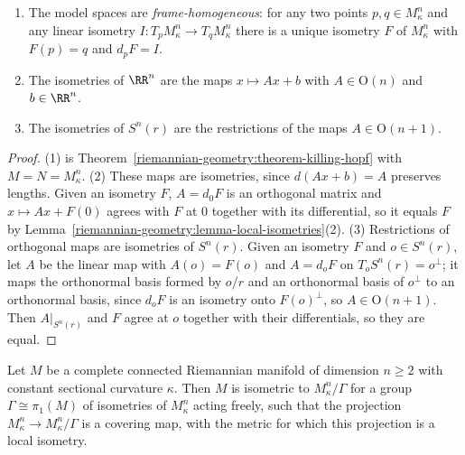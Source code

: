 \begin{corollary}\label{riemannian-geometry:corollary-model-isometries}
\begin{enumerate}
\item The model spaces are \emph{frame-homogeneous}: for any two points $p, q \in M^n_\kappa$ and any linear isometry $I \colon T_pM^n_\kappa \to T_qM^n_\kappa$ there is a
unique isometry $F$ of $M^n_\kappa$ with $F(p) = q$ and $d_pF = I$.
\item The isometries of $\RR^n$ are the maps $x \mapsto Ax + b$ with $A \in \mathrm{O}(n)$ and $b \in \RR^n$.
\item The isometries of $S^n(r)$ are the restrictions of the maps $A \in \mathrm{O}(n + 1)$.
\end{enumerate}
\end{corollary}

\begin{proof}
(1) is Theorem~\ref{riemannian-geometry:theorem-killing-hopf} with $M = N = M^n_\kappa$. (2) These maps are isometries, since $d(Ax + b) = A$ preserves lengths. Given
an isometry $F$, $A = d_0F$ is an orthogonal matrix and $x \mapsto Ax + F(0)$ agrees with $F$ at $0$ together with its differential, so it equals $F$ by
Lemma~\ref{riemannian-geometry:lemma-local-isometries}(2). (3) Restrictions of orthogonal maps are isometries of $S^n(r)$. Given an isometry $F$ and $o \in S^n(r)$,
let $A$ be the linear map with $A(o) = F(o)$ and $A = d_oF$ on $T_oS^n(r) = o^\perp$; it maps the orthonormal basis formed by $o/r$ and an orthonormal basis of $o^\perp$
to an orthonormal basis, since $d_oF$ is an isometry onto $F(o)^\perp$, so $A \in \mathrm{O}(n + 1)$. Then $A|_{S^n(r)}$ and $F$ agree at $o$ together with their
differentials, so they are equal.
\end{proof}

\begin{corollary}\label{riemannian-geometry:corollary-space-forms}
Let $M$ be a complete connected Riemannian manifold of dimension $n \geq 2$ with constant sectional curvature $\kappa$. Then $M$ is isometric to $M^n_\kappa/\Gamma$ for
a group $\Gamma \cong \pi_1(M)$ of isometries of $M^n_\kappa$ acting freely, such that the projection $M^n_\kappa \to M^n_\kappa/\Gamma$ is a covering map, with the metric for
which this projection is a local isometry.
\end{corollary}

